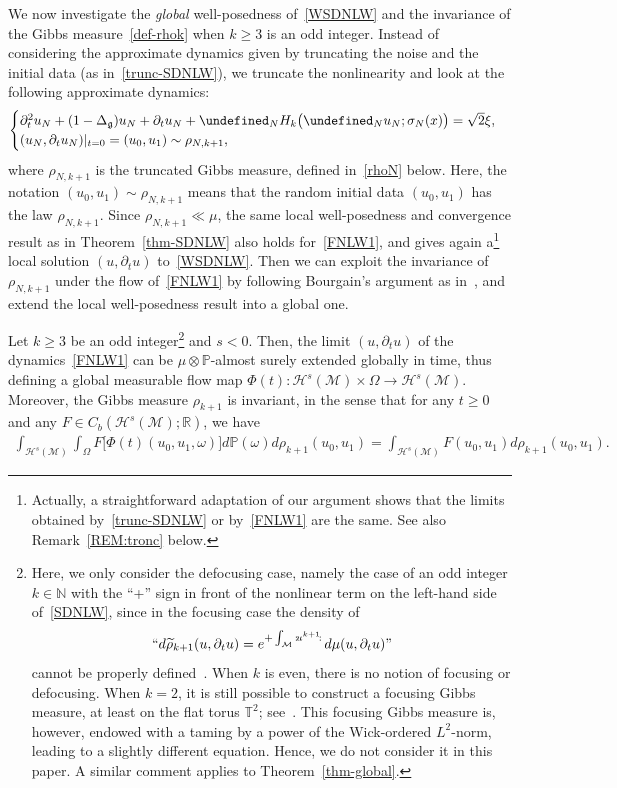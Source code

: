 \documentclass[AHL,Unicode,longabstracts,published]{cedram}
\newcommand{\R}{\mathbb{R}}
\newcommand{\T}{\mathbb{T}}
\newcommand{\Prob}{\mathbb{P}}
\newcommand{\N}{\mathbb{N}}
\let\P= \undefined
\newcommand{\P}{\mathbf{P}}
\newcommand{\M}{\mathcal{M}}
\renewcommand{\H}{\mathcal{H}}
\newcommand{\g}{\mathfrak{g}}
\newcommand{\Dlg}{\Delta_{\g}}
\newcommand{\s}{\sigma}
\newcommand{\dt}{\partial_t}
\renewcommand{\o}{\omega}
\renewcommand{\O}{\Omega}
\begin{document}
We now investigate the \emph{global} well-posedness of~\eqref{WSDNLW} and the invariance of the Gibbs measure~\eqref{def-rhok} when $k\ge 3$ is an odd integer. Instead of considering the approximate dynamics given by truncating the noise and the initial data (as in~\eqref{trunc-SDNLW}), we truncate the nonlinearity and look at the following approximate dynamics:
\begin{equation}\label{FNLW1}
\begin{cases}
\dt^2 u_N +(1-\Dlg)u_N + \dt u_N + \P_NH_k\big(\P_N u_N;\s_N(x)\big) = \sqrt{2}\xi,\\
(u_N,\dt u_N)|_{t=0}=(u_0,u_1)\sim\rho_{N,k+1},
\end{cases}
\end{equation}
where $\rho_{N,k+1}$ is the truncated Gibbs measure, defined in~\eqref{rhoN} below. Here, the notation $(u_0,u_1)\sim\rho_{N,k+1}$ means that the random initial data $(u_0, u_1)$ has the law $\rho_{N, k+1}$. Since $\rho_{N,k+1}\ll\mu$, the same local well-posedness and convergence result as in Theorem~\ref{thm-SDNLW} also holds for~\eqref{FNLW1}, and gives again a\footnote{Actually, a straightforward adaptation of our argument shows that the limits obtained by~\eqref{trunc-SDNLW} or by~\eqref{FNLW1} are the same. See also Remark~\ref{REM:tronc} below.} local solution $(u,\dt u)$ to~\eqref{WSDNLW}. Then we can exploit the invariance of $\rho_{N,k+1}$ under the flow of~\eqref{FNLW1} by following Bourgain's argument as in~\cite{BO94,BO96,Tz,BT2,BTT2}, and extend the local well-posedness result into a global one.

\begin{theo}\label{thm-invariance}
Let $k \geq 3$ be an odd integer\footnote{Here, we only consider the defocusing case, namely the case of an odd integer $k\in\N$ with the ``+'' sign in front of the nonlinear term on the left-hand side of~\eqref{SDNLW}, since in the focusing case the density of 
\[
``d\widetilde{\rho}_{k+1}(u,\dt u)=e^{+\int_\M\,:\!u^{k+1}\!:\,}d\mu(u,\dt u)\text{''}
\]
cannot be properly defined~\cite{BS, OST}. When $k$ is even, there is no notion of focusing or defocusing. When $k = 2$, it is still possible to construct a focusing Gibbs measure, at least on the flat torus $\T^2$; see~\cite{BO95, OST}. This focusing Gibbs measure is, however, endowed with a taming by a power of the Wick-ordered $L^2$-norm, leading to a slightly different equation. Hence, we do not consider it in this paper. A similar comment applies to Theorem~\ref{thm-global}.} and $s < 0$. Then, the limit $(u,\dt u)$ of the dynamics~\eqref{FNLW1} can be $\mu\otimes\Prob$-almost surely extended globally in time, thus defining a global measurable flow map $\Phi(t) : \H^s(\M)\times \O \to \H^s(\M)$. Moreover, the Gibbs measure $\rho_{k+1}$ is invariant, in the sense that for any $t\ge 0$ and any $F\in C_b(\H^s(\M);\R)$, we have
\begin{align*}
\int_{\H^s(\M)}\int_\O F\big[\Phi(t)(u_0,u_1,\o)\big]d\Prob(\o)d\rho_{k+1}(u_0,u_1) = \int_{\H^s(\M)}F(u_0,u_1)d\rho_{k+1}(u_0,u_1).
\end{align*}
\end{theo}
\end{document}
